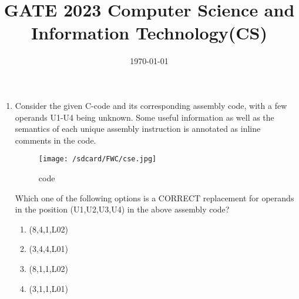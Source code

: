 \documentclass[12pt]{article}
\begin{document}
\title{\textbf{GATE 2023 Computer Science and Information Technology(CS)}}     
\date{\today}   
\maketitle 
\begin{enumerate} 
\item 
	Consider the given C-code and its corresponding assembly code, with a few operands U1-U4 being unknown. Some useful information as well as the semantics 
of each unique assembly instruction is annotated as inline comments in the code.  
\begin{figure}[!ht]
\texttt{[image: /sdcard/FWC/cse.jpg]} 
\caption{code}                           
\label{fig:code}
\end{figure}

Which one of the following options is a CORRECT replacement for operands in the position (U1,U2,U3,U4) in the above assembly code?              
\begin{enumerate}
\item (8,4,1,L02)                      
\item (3,4,4,L01)
\item (8,1,1,L02)                             
\item (3,1,1,L01)         
\end{enumerate}            
\end{enumerate}                             
\end{document}
